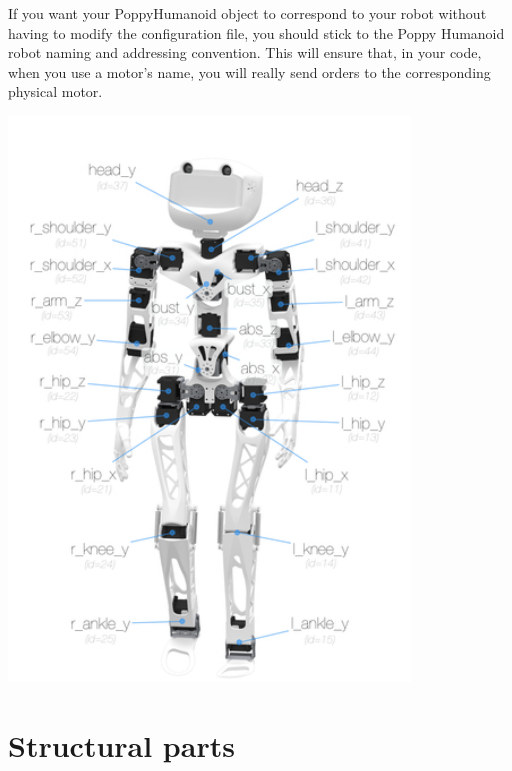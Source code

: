 \documentclass[includefoot]{article}
\begin{document}
If you want your PoppyHumanoid object to correspond to your robot without having to modify the configuration file, you should stick to the Poppy Humanoid robot naming and addressing convention. This will ensure that, in your code, when you use a motor's name, you will really send orders to the corresponding physical motor.
\begin{center}
  \includegraphics[width=0.8\textwidth]{img/motor_naming_convention}
 \end{center}
 
 
 \section{Structural parts}
 \label{structural-parts}
\end{document}
